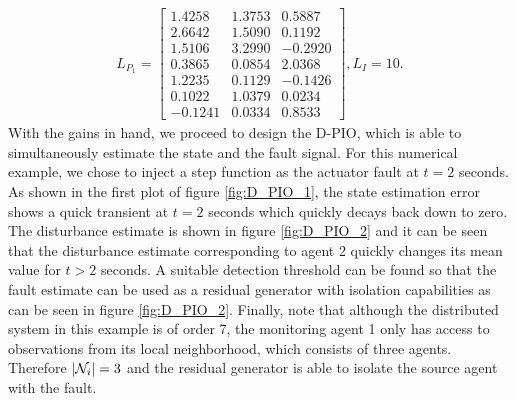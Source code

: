 \documentclass[letterpaper, 11 pt, conference]{ieeeconf}  %
\begin{document}
\begin{align*}
L_{P_1} = \left [ \begin{array}{ccc} 
    1.4258&    1.3753&    0.5887\\
    2.6642&    1.5090&    0.1192\\
    1.5106&    3.2990&   -0.2920\\
    0.3865&    0.0854&    2.0368\\
    1.2235&    0.1129&   -0.1426\\
    0.1022&    1.0379&    0.0234\\
    -0.1241&    0.0334&    0.8533 \end{array} \right ], L_I = 10.
\end{align*}
With the gains in hand, we proceed to design the D-PIO, which is able to simultaneously estimate the state and the fault signal. For this numerical example, we chose to inject a step function as the actuator fault at $t = 2$ seconds. As shown in the first plot of figure \ref{fig:D_PIO_1}, the state estimation error shows a quick transient at $t = 2$ seconds which quickly decays back down to zero. The disturbance estimate is shown in figure \ref{fig:D_PIO_2} and it can be seen that the disturbance estimate corresponding to agent 2 quickly changes its mean value for $t>2$ seconds. A suitable detection threshold can be found so that the fault estimate can be used as a residual generator with isolation capabilities as can be seen in figure \ref{fig:D_PIO_2}. Finally, note that although the distributed system in this example is of order 7, the monitoring agent 1 only has access to observations from its local neighborhood, which consists of three agents. Therefore $|\mathcal{N}_i| = 3$ and the residual generator is able to isolate the source agent with the fault. 
\end{document}
